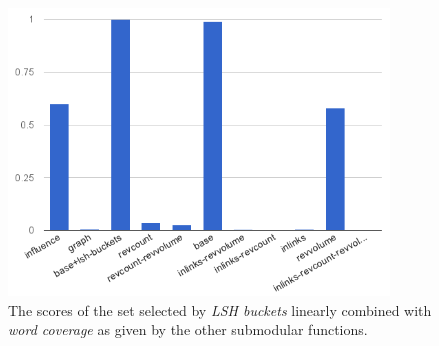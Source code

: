 \begin{figure}
  \centering
  \includegraphics[width=0.9\textwidth,natwidth=555,natheight=419]{images/wc+lsh.png}
  \caption{The scores of the set selected by \emph{\ac{LSH} buckets} linearly
  combined with \emph{word coverage} as given by the other submodular
  functions.}
  \label{img:wc+lsh}
\end{figure}

